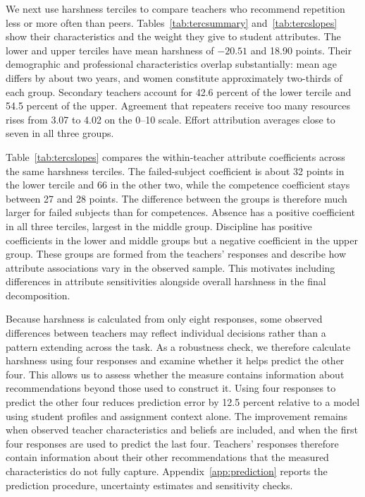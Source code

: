 We next use harshness terciles to compare teachers who recommend repetition less or more often than peers. Tables~\ref{tab:tercsummary} and~\ref{tab:tercslopes} show their characteristics and the weight they give to student attributes. The lower and upper terciles have mean harshness of $-20.51$ and 18.90 points. Their demographic and professional characteristics overlap substantially: mean age differs by about two years, and women constitute approximately two-thirds of each group. Secondary teachers account for 42.6 percent of the lower tercile and 54.5 percent of the upper. Agreement that repeaters receive too many resources rises from 3.07 to 4.02 on the 0--10 scale. Effort attribution averages close to seven in all three groups.

Table~\ref{tab:tercslopes} compares the within-teacher attribute coefficients across the same harshness terciles. The failed-subject coefficient is about 32 points in the lower tercile and 66 in the other two, while the competence coefficient stays between 27 and 28 points. The difference between the groups is therefore much larger for failed subjects than for competences. Absence has a positive coefficient in all three terciles, largest in the middle group. Discipline has positive coefficients in the lower and middle groups but a negative coefficient in the upper group. These groups are formed from the teachers' responses and describe how attribute associations vary in the observed sample. This motivates including differences in attribute sensitivities alongside overall harshness in the final decomposition.

Because harshness is calculated from only eight responses, some observed differences between teachers may reflect individual decisions rather than a pattern extending across the task. As a robustness check, we therefore calculate harshness using four responses and examine whether it helps predict the other four. This allows us to assess whether the measure contains information about recommendations beyond those used to construct it. Using four responses to predict the other four reduces prediction error by 12.5 percent relative to a model using student profiles and assignment context alone. The improvement remains when observed teacher characteristics and beliefs are included, and when the first four responses are used to predict the last four. Teachers' responses therefore contain information about their other recommendations that the measured characteristics do not fully capture. Appendix~\ref{app:prediction} reports the prediction procedure, uncertainty estimates and sensitivity checks.


